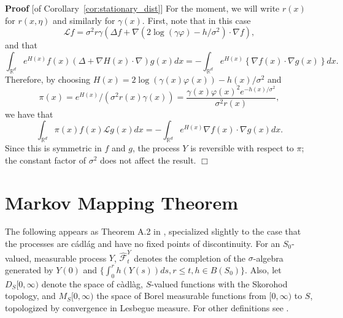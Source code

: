 \documentclass[12pt]{article}
\newenvironment {proof}{{\noindent\bf Proof }}{\hfill $\Box$ \medskip}
\def \hat{\widehat}
\newcommand{\IR}{\mathbb R}
\newcommand{\grad}{\nabla}
\newcommand{\Lgen}{\mathcal{L}}    %
\numberwithin{equation}{section}
\begin{document}
\begin{proof}[of Corollary~\ref{cor:stationary_dist}]
For the moment, we will write $r(x)$ for $r(x, \eta)$
and similarly for $\gamma(x)$.
First, note that in this case
$$
    \Lgen f = \sigma^2 r \gamma \left(
        \Delta f
        + \grad ( 2 \log(\gamma \varphi) - h/\sigma^2 ) \cdot \grad f
    \right) ,
$$
and that
$$
    \int_{\IR^d} e^{H(x)} f(x) (\Delta + \grad H(x) \cdot \grad) g(x) dx
    =
    - \int_{\IR^d} e^{H(x)} \left\{
        \grad f(x) \cdot \grad g(x)
    \right\} dx .
$$
Therefore, by choosing $H(x) = 2 \log(\gamma(x) \varphi(x)) - h(x)/\sigma^2$
and
$$ \pi(x)
    = e^{H(x)} / (\sigma^2 r(x) \gamma(x))
    = \frac{\gamma(x) \varphi(x)^2 e^{-h(x)/\sigma^2}}{\sigma^2 r(x)} ,
$$
we have that
$$
    \int_{\IR^d} \pi(x) f(x) \Lgen g(x) dx
    =
    - \int_{\IR^d} e^{H(x)} \grad f(x) \cdot \grad g(x) dx .
$$
Since this is symmetric in $f$ and $g$, the process $Y$ is reversible with respect to $\pi$;
the constant factor of $\sigma^2$ does not affect the result.
\end{proof}


\newpage
\appendix

\section{Markov Mapping Theorem}
\label{apx:mmt}

The following appears as Theorem A.2 in \citet{etheridge/kurtz:2019},
specialized slightly to the case that the processes 
are c\'adl\'ag and have no fixed points of discontinuity.
For an $S_0$-valued, measurable process $Y$, $\hat{\mathcal{F}}^Y_t$
denotes the completion of the $\sigma$-algebra generated by
$Y(0)$ and $\{\int_0^r h(Y(s)) ds, r \le t, h \in B(S_0)\}$.
Also, let $D_S[0,\infty)$ denote the space of c\`adl\`ag, $S$-valued functions
with the Skorohod topology, and $M_S[0,\infty)$ the space of Borel measurable functions
from $[0,\infty)$ to $S$,
topologized by convergence in Lesbegue measure.
For other definitions see \citet{etheridge/kurtz:2019}.
\end{document}
